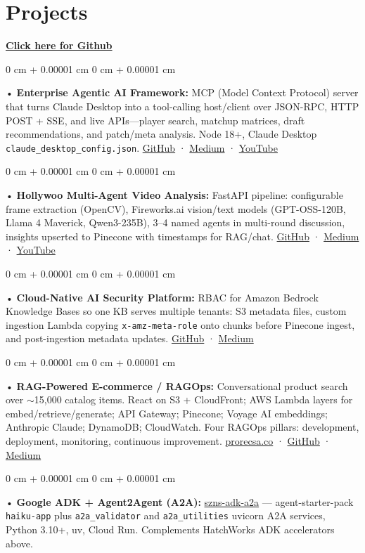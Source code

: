 \documentclass[10pt, letterpaper]{article}
\newenvironment{onecolentry}{
    \begin{adjustwidth}{
        0 cm + 0.00001 cm
    }{
        0 cm + 0.00001 cm
    }
}{
    \end{adjustwidth}
} %
\begin{document}
\section{Projects}
    \vspace{2 pt}
\textbf{\href{https://github.com/daedalus-s}{Click here for Github}}
\begin{onecolentry}
     • \textbf{Enterprise Agentic AI Framework:} MCP (Model Context Protocol) server that turns Claude Desktop into a tool-calling host/client over JSON-RPC, HTTP POST + SSE, and live APIs---player search, matchup matrices, draft recommendations, and patch/meta analysis. Node 18+, Claude Desktop \texttt{claude\_desktop\_config.json}. \href{https://github.com/daedalus-s/dota2-mcp-server}{GitHub} · \href{https://medium.com/@sreenikethaathreya/get-good-at-using-ai-noob-5d2576203112}{Medium} · \href{https://www.youtube.com/watch?v=op2gTYyFb5U}{YouTube}
\end{onecolentry}
\begin{onecolentry}
     • \textbf{Hollywoo Multi-Agent Video Analysis:} FastAPI pipeline: configurable frame extraction (OpenCV), Fireworks.ai vision/text models (GPT-OSS-120B, Llama 4 Maverick, Qwen3-235B), 3--4 named agents in multi-round discussion, insights upserted to Pinecone with timestamps for RAG/chat. \href{https://github.com/daedalus-s/fireworks-video-discussion}{GitHub} · \href{https://medium.com/@sreenikethaathreya/hollywoo-ai-video-analysis-5eae37ca7e16}{Medium} · \href{https://www.youtube.com/watch?v=KBs_3V0OAgU}{YouTube}
\end{onecolentry}
\begin{onecolentry}
     • \textbf{Cloud-Native AI Security Platform:} RBAC for Amazon Bedrock Knowledge Bases so one KB serves multiple tenants: S3 metadata files, custom ingestion Lambda copying \texttt{x-amz-meta-role} onto chunks before Pinecone ingest, and post-ingestion metadata updates. \href{https://github.com/daedalus-s/bedrock-acl-metadata}{GitHub} · \href{https://medium.com/@sreenikethaathreya/building-a-permission-aware-genai-application-on-amazon-bedrock-8fdc2410dd43}{Medium}
\end{onecolentry}
\begin{onecolentry}
     • \textbf{RAG-Powered E-commerce / RAGOps:} Conversational product search over $\sim$15,000 catalog items. React on S3 + CloudFront; AWS Lambda layers for embed/retrieve/generate; API Gateway; Pinecone; Voyage AI embeddings; Anthropic Claude; DynamoDB; CloudWatch. Four RAGOps pillars: development, deployment, monitoring, continuous improvement. \href{https://prorecsa.co}{prorecsa.co} · \href{https://github.com/daedalus-s/ragops-doc}{GitHub} · \href{https://medium.com/@sreenikethaathreya/from-rags-to-riches-bba8a671d5e6}{Medium}
\end{onecolentry}
\begin{onecolentry}
     • \textbf{Google ADK + Agent2Agent (A2A):} \href{https://github.com/daedalus-s/szns-adk-a2a}{szns-adk-a2a} --- agent-starter-pack \texttt{haiku-app} plus \texttt{a2a\_validator} and \texttt{a2a\_utilities} uvicorn A2A services, Python 3.10+, uv, Cloud Run. Complements HatchWorks ADK accelerators above.
\end{onecolentry}
\vspace{2 pt}
\end{document}
